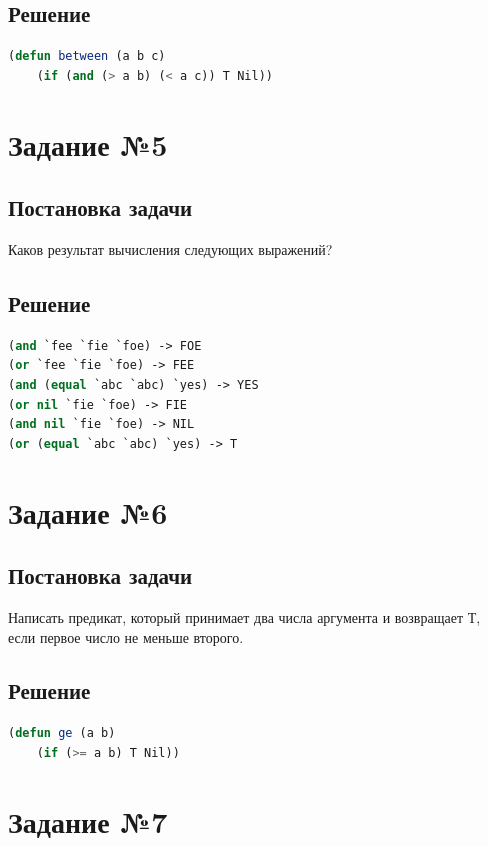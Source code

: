 \documentclass[12pt]{report}
\begin{document}
\subsection*{Решение}
\begin{lstlisting}[label=4,caption=Решение задания №4, language=lisp]
(defun between (a b c)
	(if (and (> a b) (< a c)) T Nil))
\end{lstlisting}

\section*{Задание №5}
\subsection*{Постановка задачи}
Каков результат вычисления следующих выражений?

\subsection*{Решение}
\begin{lstlisting}[label=5,caption=Решение задания №5, language=lisp]
(and `fee `fie `foe) -> FOE
(or `fee `fie `foe) -> FEE
(and (equal `abc `abc) `yes) -> YES
(or nil `fie `foe) -> FIE
(and nil `fie `foe) -> NIL
(or (equal `abc `abc) `yes) -> T
\end{lstlisting}

\section*{Задание №6}
\subsection*{Постановка задачи}
Написать предикат, который принимает два числа аргумента и возвращает Т, если первое число не меньше второго.

\subsection*{Решение}
\begin{lstlisting}[label=6,caption=Решение задания №6, language=lisp]
(defun ge (a b)
	(if (>= a b) T Nil))
\end{lstlisting}

\section*{Задание №7}
\end{document}
